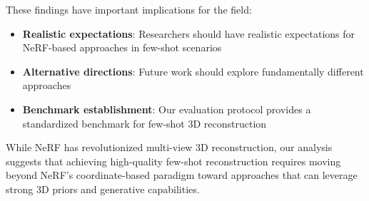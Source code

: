 \documentclass[11pt]{article}
\begin{document}
These findings have important implications for the field:
\begin{itemize}
    \item \textbf{Realistic expectations}: Researchers should have realistic expectations for NeRF-based approaches in few-shot scenarios
    \item \textbf{Alternative directions}: Future work should explore fundamentally different approaches
    \item \textbf{Benchmark establishment}: Our evaluation protocol provides a standardized benchmark for few-shot 3D reconstruction
\end{itemize}

While NeRF has revolutionized multi-view 3D reconstruction, our analysis suggests that achieving high-quality few-shot reconstruction requires moving beyond NeRF's coordinate-based paradigm toward approaches that can leverage strong 3D priors and generative capabilities.
\end{document}
